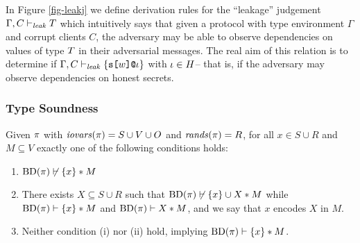 In Figure \ref{fig-leakj} we define derivation rules for the
``leakage'' judgement $\Gamma,C \vdash_{\mathit{leak}} T$ which intuitively says
that given a protocol with type environment $\Gamma$ and corrupt
clients $C$, the adversary may be able to observe dependencies on
values of type $T$ in their adversarial messages.  The real aim of
this relation is to determine if
$\Gamma,C \vdash_{\mathit{leak}} \{ \texttt{s[}w\texttt{]}\texttt{@}\iota \}$ with $\iota \in H$-- that is,
if the adversary may observe dependencies on honest secrets.

\subsubsection{Type Soundness}


\begin{lemma}
  \label{lemma-interference}
  Given $\pi$ with $\mathit{iovars}(\pi) = S \cup V \cup O$ and $\mathit{rands}(\pi) = R$,
  for all $x \in S \cup R$ and $M \subseteq V$ exactly one of the following conditions holds:
  \begin{enumerate}[\hspace{5mm}i.]
  \item $\mathrm{BD}(\pi) \not\vdash \{ x \} * M$
  \item There exists $X \subseteq S \cup R$ such that
    $\mathrm{BD}(\pi) \not\vdash \{ x \} \cup X * M$ while
    $\mathrm{BD}(\pi) \vdash \{ x \} * M$ and $\mathrm{BD}(\pi) \vdash X * M$,
    and we say that $x$ encodes $X$ in $M$.
  \item Neither condition (i) nor (ii) hold, implying $\mathrm{BD}(\pi) \vdash \{ x \} * M$.
  \end{enumerate}
\end{lemma}


